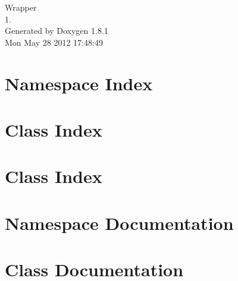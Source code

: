 \documentclass{book}
\begin{document}
\hypersetup{pageanchor=false,citecolor=blue}
\begin{titlepage}
\vspace*{7cm}
\begin{center}
{\Large Wrapper \\[1ex]\large 1. }\\
\vspace*{1cm}
{\large Generated by Doxygen 1.8.1}\\
\vspace*{0.5cm}
{\small Mon May 28 2012 17:48:49}\\
\end{center}
\end{titlepage}
\clearemptydoublepage
{}
\tableofcontents
\clearemptydoublepage
{}
\hypersetup{pageanchor=true,citecolor=blue}
\chapter{Namespace Index}

\chapter{Class Index}

\chapter{Class Index}

\chapter{Namespace Documentation}

\chapter{Class Documentation}












































\printindex
\end{document}
